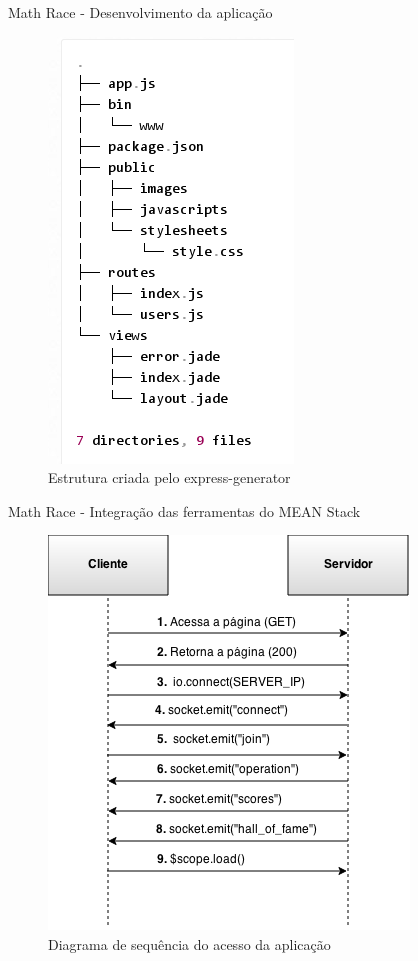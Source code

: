 \documentclass{beamer}
\begin{document}
\begin{frame}{Math Race - Desenvolvimento da aplicação}
\begin{figure}[htb]
    \centering
    \includegraphics[scale=0.35]{../images/estrutura_exp_gen.png}
    \caption{Estrutura criada pelo express-generator}
    \label{fig: dir_mean_exp}
    \end{figure}
\end{frame}

\begin{frame}{Math Race - Integração das ferramentas do MEAN Stack}
    \begin{figure}[hbt]
    \centering
    \includegraphics[scale=0.39]{../images/diagrama_de_seq_acesso.png}
    \caption{Diagrama de sequência do acesso da aplicação}
    \label{fig:appSchema}
    \end{figure}
\end{frame}
\end{document}
